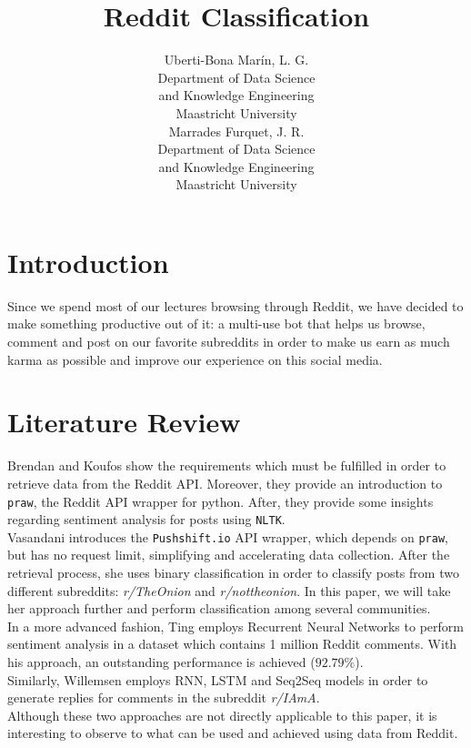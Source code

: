 \documentclass[11pt,a4paper]{article}
\title{Reddit Classification}
\author{Uberti-Bona Mar\'{i}n, L. G. \\
  Department of Data Science \\
  and Knowledge Engineering \\
  Maastricht University \\\And
  Marrades Furquet, J. R. \\
  Department of Data Science \\
  and Knowledge Engineering \\
  Maastricht University}
\date{}
\begin{document}
\maketitle

\section{Introduction}
\label{sec:introduction}
Since we spend most of our lectures browsing through Reddit, we have decided to make
something productive out of it: a multi-use bot that helps us browse, comment and post
on our favorite subreddits in order to make us earn as much karma as possible and
improve our experience on this social media.

\section{Literature Review}
\label{sec:literature_review}
Brendan and Koufos show the requirements which must be fulfilled in order to
retrieve data from the Reddit API. Moreover, they provide an introduction to
\texttt{praw}, the Reddit API wrapper for python. After, they provide some insights
regarding sentiment analysis for posts using \texttt{NLTK}.\\

Vasandani  introduces the \texttt{Pushshift.io} API wrapper,
which depends on \texttt{praw}, but has no request limit, simplifying and accelerating
data collection. After the retrieval process, she uses binary classification in order to
classify posts from two different subreddits: \textit{r/TheOnion} and
\textit{r/nottheonion}. In this paper, we will take her approach further and perform
classification among several communities.\\

In a more advanced fashion, Ting employs Recurrent Neural Networks to
perform sentiment analysis in a dataset which contains 1 million Reddit comments.
With his approach, an outstanding performance is achieved ($92.79\%$).\\
Similarly, Willemsen  employs RNN, LSTM and Seq2Seq
models in order to generate replies for comments in the subreddit \textit{r/IAmA}.\\
Although these two approaches are not directly applicable to this paper, it is interesting
to observe to what can be used and achieved using data from Reddit.
\end{document}

